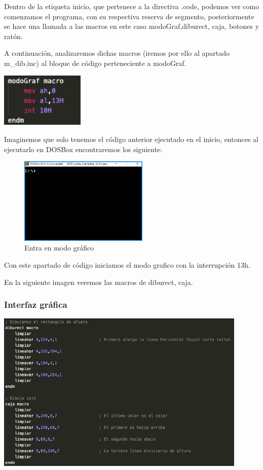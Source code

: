 \documentclass[letterpaper,12 pt,titlepage]{article}
\begin{document}
    Dentro de la etiqueta inicio, que pertenece a la directiva .code, podemos ver como comenzamos el programa, con su respectiva reserva de segmento, posteriormente se hace una llamada a las macros en este caso modoGraf,diburect, caja, botones y ratón.
    
    A continuación, analizaremos dichas macros (iremos por ello al apartado m\_dib.inc) al bloque de código perteneciente a modoGraf.

    \begin{center}
        \includegraphics[width=0.3\textwidth]{img/05.png}
    \end{center}

    Imaginemos que solo tenemos el código anterior ejecutado en el inicio, entonces al ejecutarlo en DOSBox encontraremos los siguiente:

    \begin{figure}[H]
    \centering
    \includegraphics[width=0.55\textwidth]{img/06.png}
    \caption{Entra en modo gráfico}
    \end{figure}

    Con este apartado de código iniciamos el modo grafico con la interrupción 13h.
    
    En la siguiente imagen veremos las macros de diburect, caja.
    
    \subsubsection{Interfaz gráfica}

    \begin{center}
        \includegraphics[width=0.9\textwidth]{img/07.png}
    \end{center}
\end{document}
